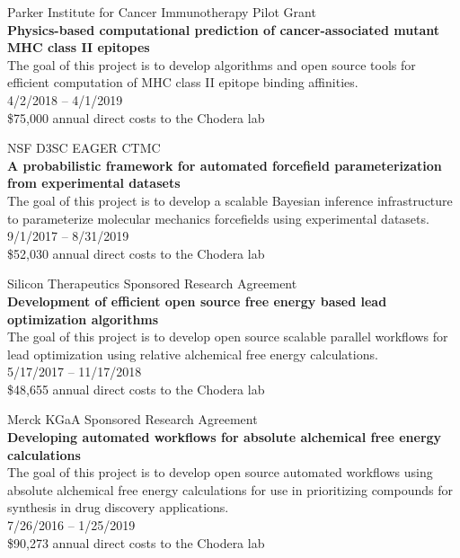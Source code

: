 \documentclass[10pt]{article}
\begin{document}
\vspace{1.5ex}

Parker Institute for Cancer Immunotherapy Pilot Grant \\
{\bf Physics-based computational prediction of cancer-associated mutant MHC class II epitopes} \\
The goal of this project is to develop algorithms and open source tools for efficient computation of MHC class II epitope binding affinities.\\
4/2/2018 -- 4/1/2019 \\
\$75,000 annual direct costs to the Chodera lab

\vspace{1.5ex}

NSF D3SC EAGER CTMC \\
{\bf A probabilistic framework for automated forcefield parameterization from experimental datasets} \\
The goal of this project is to develop a scalable Bayesian inference infrastructure to parameterize molecular mechanics forcefields using experimental datasets. \\
9/1/2017 -- 8/31/2019 \\
\$52,030 annual direct costs to the Chodera lab

\vspace{1.5ex}

Silicon Therapeutics Sponsored Research Agreement \\
{\bf Development of efficient open source free energy based lead optimization algorithms} \\
The goal of this project is to develop open source scalable parallel workflows for lead optimization using relative alchemical free energy calculations. \\
5/17/2017 -- 11/17/2018\\
\$48,655 annual direct costs to the Chodera lab

\vspace{1.5ex}

Merck KGaA Sponsored Research Agreement \\
{\bf Developing automated workflows for absolute alchemical free energy calculations} \\
The goal of this project is to develop open source automated workflows using absolute alchemical free energy calculations for use in prioritizing compounds for synthesis in drug discovery applications. \\
7/26/2016 -- 1/25/2019 \\
\$90,273 annual direct costs to the Chodera lab
\end{document}
